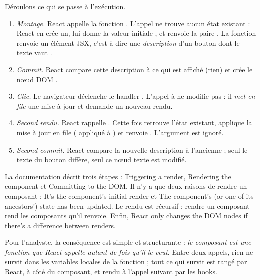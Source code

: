 Déroulons ce qui se passe à l'exécution.
\begin{enumerate}
  \item \emph{Montage.} React appelle la fonction . L'appel
     ne trouve aucun état existant : React en crée un, lui
    donne la valeur initiale , et renvoie la paire
    \code{[0, setCount]}. La fonction renvoie un élément JSX, c'est-à-dire une
    \emph{description} d'un bouton dont le texte vaut .
  \item \emph{Commit.} React compare cette description à ce qui est affiché
    (rien) et crée le nœud DOM .
  \item \emph{Clic.} Le navigateur déclenche le handler
    . L'appel à  ne modifie
    pas  : il \emph{met en file} une mise à jour et demande un
    nouveau rendu.
  \item \emph{Second rendu.} React rappelle . Cette fois
     retrouve l'état existant, applique la mise à jour en
    file ( appliqué à ) et renvoie \code{[1, setCount]}.
    L'argument  est ignoré.
  \item \emph{Second commit.} React compare la nouvelle description à
    l'ancienne ; seul le texte du bouton diffère, seul ce nœud texte est
    modifié.
\end{enumerate}

\begin{react}
La documentation décrit trois étapes \cite{ReactRenderCommit} :
\og Triggering a render\fg{}, \og Rendering the component\fg{} et
\og Committing to the DOM\fg{}. Il n'y a que deux raisons de rendre un
composant : \og It's the component's initial render\fg{} et \og The component's
(or one of its ancestors') state has been updated\fg{}. Le rendu est récursif :
rendre un composant rend les composants qu'il renvoie. Enfin, \og React only
changes the DOM nodes if there's a difference between renders\fg{}.
\end{react}

Pour l'analyste, la conséquence est simple et structurante : \emph{le composant
est une fonction que React appelle autant de fois qu'il le veut}. Entre deux
appels, rien ne survit dans les variables locales de la fonction ; tout ce qui
survit est rangé par React, à côté du composant, et rendu à l'appel suivant par
les hooks.

